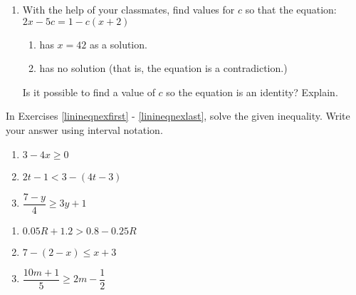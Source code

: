 \documentclass{ximera}
\begin{document}
\begin{enumerate}
\setcounter{enumi}{\value{HW}}

\item With the help of your classmates, find values for $c$ so that the equation:  $2x - 5c = 1 - c(x+2)$

\begin{enumerate}

\item  has $x = 42$ as a solution.
\item  has no solution (that is, the equation is a contradiction.)

\end{enumerate}
Is it possible to find a value of $c$ so the equation is an identity?  Explain.

\setcounter{HW}{\value{enumi}}
\end{enumerate}

\newpage


In Exercises \ref{linineqnexfirst} - \ref{linineqnexlast}, solve the given inequality.  Write your answer using interval notation.

\begin{multicols}{3}
\begin{enumerate}
\setcounter{enumi}{\value{HW}}
\item $3 - 4x \geq 0$\label{linineqnexfirst}
\item  $2t - 1 < 3 - (4t-3)$
\item  $\dfrac{7 -y}{4} \geq 3y + 1$ 

\setcounter{HW}{\value{enumi}}
\end{enumerate}
\end{multicols}

\begin{multicols}{3}
\begin{enumerate}
\setcounter{enumi}{\value{HW}}

\item $0.05R + 1.2 > 0.8 - 0.25R$
\item $7 - (2-x) \leq x+3$
\item $\dfrac{10m+1}{5} \geq 2m - \dfrac{1}{2}$ 

\setcounter{HW}{\value{enumi}}
\end{enumerate}
\end{multicols}
\end{document}
